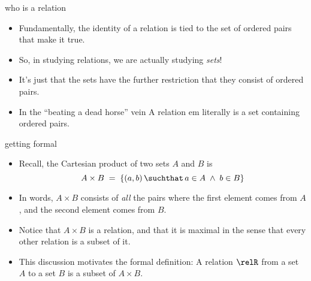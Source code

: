 \documentclass[handout,landscape]{beamer}
\begin{document}
\begin{frame}{who is a relation}
\begin{itemize}
\item Fundamentally, the identity of a relation is tied to the set of ordered pairs that make it true.\pause
\item So, in studying relations, we are actually studying {\em sets}! \pause
\item It's just that the sets have the further restriction that they consist of ordered pairs. \pause
\item In the ``beating a dead horse'' vein\textellipsis \pause
A relation {em literally is} a set containing ordered pairs.
\end{itemize}
\end{frame}

\begin{frame}{getting formal}
	\begin{itemize}
		\item Recall, the Cartesian product of two sets $A$ and $B$ is \pause
		\[ A \times B \; = \; \{ (a,b) \, \suchthat \, a \in A \; \land \; b \in B \} \] \pause
		\item In words, $A \times B$ consists of {\em all} the pairs where the first element comes from $A$, and the second element comes from $B$. \pause
		\item Notice that $A \times B$ is a relation, and that it is maximal in the sense that every other relation is a subset of it. \pause
		\item This discussion motivates the formal definition: \pause 
		A relation $\relR$ from a set $A$ to a set $B$ is a subset of $A \times B$.  
	\end{itemize}
\end{frame}
\end{document}
